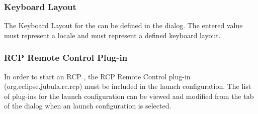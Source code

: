 \subsubsection{Keyboard Layout}
The Keyboard Layout for the \gdaut{} can be defined in the 
 dialog. The entered value must 
represent a locale and must represent a defined keyboard layout.

\subsubsection{RCP Remote Control Plug-in}
In order to start an RCP \gdaut{}, the RCP Remote Control plug-in 
(org.eclipse.jubula.rc.rcp) must be included in the launch configuration.
The list of plug-ins for the launch configuration can be viewed and modified 
from the  tab of the 
dialog when an  launch configuration is selected.